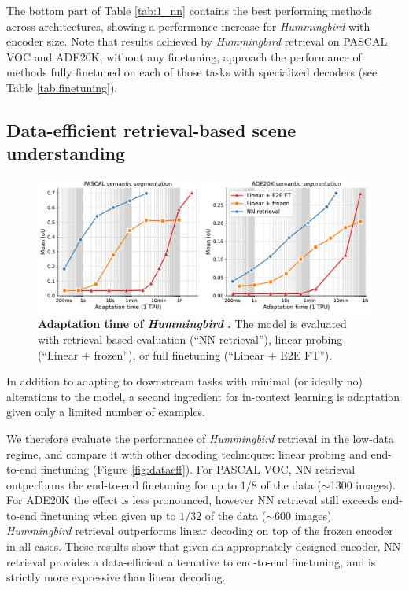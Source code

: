 \documentclass{article}
\newcommand{\ours}{\textit{Hummingbird} }
\begin{document}
The bottom part of Table \ref{tab:1_nn} contains the best performing methods across architectures, showing a performance increase for \ours with encoder size. 
Note that results achieved by \ours retrieval on PASCAL VOC and ADE20K, without any finetuning, approach the performance of methods fully finetuned on each of those tasks with specialized decoders (see Table \ref{tab:finetuning}).


\subsection{Data-efficient retrieval-based scene understanding} \label{sec:eval_dataeff}



\begin{figure}[ht]
  \begin{center}
    \includegraphics[width=\textwidth]{figures/fast_adapt.pdf}
  \end{center}
\vspace{-1em}
\caption{\textbf{Adaptation time of \ours\hspace{-0.25em}.} The model is evaluated with retrieval-based evaluation (``NN retrieval''), linear probing (``Linear + frozen''), or full finetuning (``Linear + E2E FT'').}
\label{fig:fastadapt}
\end{figure}


In addition to adapting to downstream tasks with minimal (or ideally no) alterations to the model, a second ingredient for in-context learning is adaptation given only a limited number of examples.

We therefore evaluate the performance of \ours retrieval in the low-data regime, and compare it with other decoding techniques: linear probing and end-to-end finetuning
(Figure \ref{fig:dataeff}). For PASCAL VOC, NN retrieval outperforms the end-to-end finetuning for up to \(1/8\) of the data ($\sim$1300 images). For ADE20K the effect is less pronounced, however NN retrieval still exceeds end-to-end finetuning when given up to \(1/32\) of the data ($\sim$600 images). \ours retrieval outperforms linear decoding on top of the frozen encoder in all cases. These results show that given an appropriately designed encoder, NN retrieval provides a data-efficient alternative to end-to-end finetuning, and is strictly more expressive than linear decoding.
\end{document}
